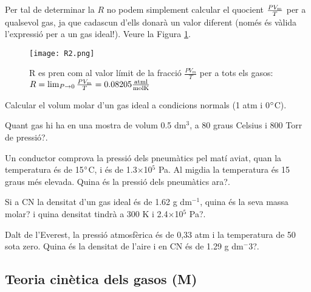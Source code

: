 Per tal de determinar la $R$ no podem simplement calcular el quocient $\frac{P V_{\rm m}}{T}$ per a qualsevol gas, ja que cadascun d'ells donarà un valor diferent (només és vàlida l'expressió per a un gas ideal!). Veure la Figura \ref{fig:R2}.
\begin{figure}[h]
\centering
\texttt{[image: R2.png]}
\caption[Determinació de la constant dels gasos $R$]{R es pren com al valor límit de la fracció $\frac{P V_m}{T}$ per a tots els gasos: 
$R=\lim_{P \to 0} \frac{P V_{\rm m}}{T}= 0.08205 \frac{{\rm atm l}}{{\rm mol K}}$
}
\label{fig:R2}
\end{figure}

\begin{exr}
Calcular el volum molar d'un gas ideal a condicions normals (1 atm i 0$\degree$C).
\end{exr}

\begin{exr}
Quant gas hi ha en una mostra de volum 0.5 dm$^3$, a 80 graus Celsius i 800 Torr de pressió?.
\end{exr}

\begin{exr}
Un conductor comprova la pressió dels pneumàtics pel matí aviat, quan la temperatura és de 15$\degree$C, i és de 1.3$\times$10$^5$ Pa. Al migdia la temperatura és 15 graus més elevada. Quina és la pressió dels pneumàtics ara?.
\end{exr}

\begin{exr}
Si a CN la densitat d'un gas ideal és de 1.62 g dm$^{-1}$, quina és la seva massa molar? i quina densitat tindrà a 300 K i 2.4$\times$10$^5$ Pa?.
\end{exr}

\begin{exr}
Dalt de l'Everest, la pressió atmosfèrica és de 0,33 atm i la temperatura de 50 sota zero. Quina és la densitat de l'aire i en CN és de 1.29 g dm$^-3$?.
\end{exr}

\subsection{Teoria cinètica dels gasos (M)}

